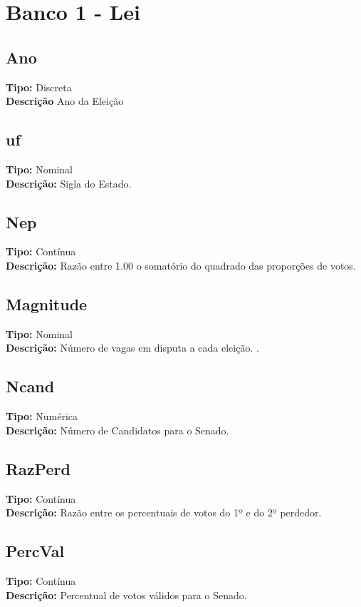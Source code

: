 \documentclass[12pt]{article}
\begin{document}
	\section{Banco 1 - Lei}
	
		\subsection{Ano}
		{\bf Tipo:} Discreta \\
		{\bf Descrição} Ano da Eleição \\
		\subsection{uf}
		{\bf Tipo:} Nominal \\
		{\bf Descrição:} Sigla do Estado. 
		\subsection{Nep}
		{\bf Tipo:} Contínua \\
		{\bf Descrição:} Razão entre 1.00 o somatório do quadrado das proporções de votos.\\
	
		
		\subsection{Magnitude}
		{\bf Tipo:} Nominal \\
		{\bf Descrição:} Número de vagas em disputa a cada eleição.
		.
		\subsection{Ncand}
		{\bf Tipo:} Numérica \\
		{\bf Descrição:} Número de Candidatos para o Senado.\\
		
		\subsection{RazPerd}
		{\bf Tipo:} Contínua \\
		{\bf Descrição:} Razão entre os percentuais de votos do 1º e do 2º perdedor.\\
		
	
		
		\subsection{PercVal}
		{\bf Tipo:} Contínua \\
		{\bf Descrição:} Percentual de votos válidos para o Senado.\\
		
\end{document}
